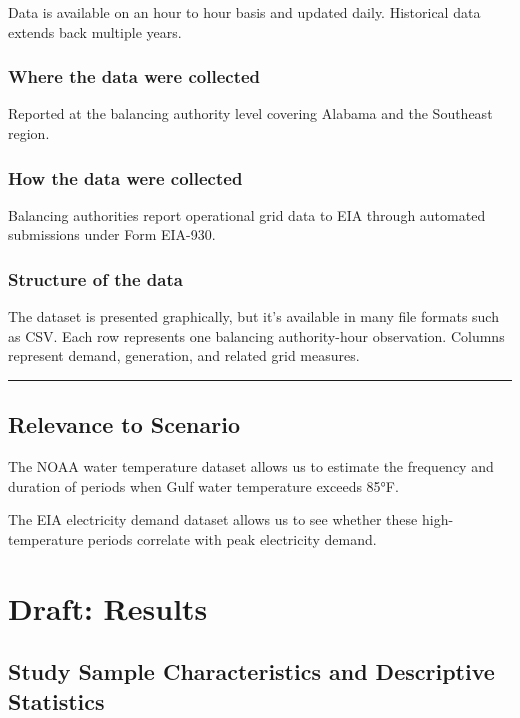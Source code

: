\documentclass[
  letterpaper,
  DIV=11,
  numbers=noendperiod]{scrreprt}
\begin{document}
Data is available on an hour to hour basis and updated daily. Historical
data extends back multiple years.

\subsection{Where the data were
collected}\label{where-the-data-were-collected}

Reported at the balancing authority level covering Alabama and the
Southeast region.

\subsection{How the data were
collected}\label{how-the-data-were-collected}

Balancing authorities report operational grid data to EIA through
automated submissions under Form EIA-930.

\subsection{Structure of the data}\label{structure-of-the-data-1}

The dataset is presented graphically, but it's available in many file
formats such as CSV. Each row represents one balancing authority-hour
observation. Columns represent demand, generation, and related grid
measures.

\begin{center}\rule{0.5\linewidth}{0.5pt}\end{center}

\section{Relevance to Scenario}\label{relevance-to-scenario}

The NOAA water temperature dataset allows us to estimate the frequency
and duration of periods when Gulf water temperature exceeds 85°F.

The EIA electricity demand dataset allows us to see whether these
high-temperature periods correlate with peak electricity demand.

\chapter{Draft: Results}\label{draft-results}

\section{Study Sample Characteristics and Descriptive
Statistics}\label{study-sample-characteristics-and-descriptive-statistics-1}
\end{document}
